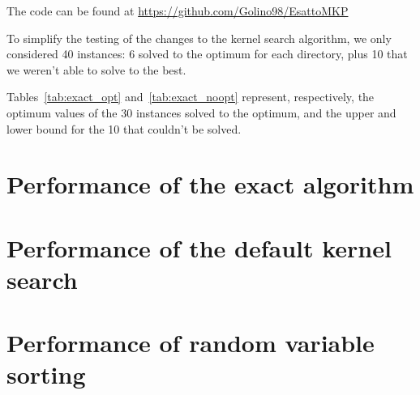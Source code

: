 The code can be found at \url{https://github.com/Golino98/EsattoMKP}

To simplify the testing of the changes to the kernel search algorithm,
we only considered 40 instances: 6 solved to the optimum for each directory,
plus 10 that we weren't able to solve to the best.

Tables~\ref{tab:exact_opt} and~\ref{tab:exact_noopt} represent,
respectively, the optimum values of the 30 instances solved to
the optimum, and the upper and lower bound for the 10
that couldn't be solved.




\section{Performance of the exact algorithm}


\section{Performance of the default kernel search}


\section{Performance of random variable sorting}
